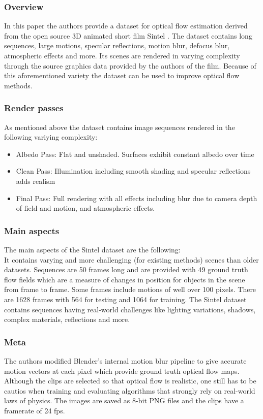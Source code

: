 \documentclass[a4paper,cleardoubleempty,BCOR1cm]{scrbook}
\begin{document}
\subsubsection{Overview}
In this paper the authors provide a dataset for optical flow estimation derived from the open source 3D animated short film Sintel
.
The dataset contains long sequences, large motions, specular reflections, motion blur, defocus blur, atmospheric effects and more. Its scenes are rendered in varying complexity through the source graphics data provided by the authors of the film. Because of this aforementioned variety the dataset can be used to improve optical flow methods. 

\subsubsection{Render passes}
As mentioned above the dataset contains image sequences rendered in the following variying complexity:\\
\begin{itemize}
	\item Albedo Pass: Flat and unshaded. Surfaces exhibit constant albedo over time
	\item Clean Pass: Illumination including smooth shading and specular reflections adds realism
	\item Final Pass: Full rendering with all effects including blur due to camera depth of field and motion, and atmospheric effects.
\end{itemize}

\subsubsection{Main aspects}
The main aspects of the Sintel dataset are the following:\\
It contains varying and more challenging (for existing methods) scenes than older datasets. Sequences are 50 frames long and are provided with 49 ground truth flow fields which are a measure of changes in position for objects in the scene from frame to frame. Some frames include motions of well over 100 pixels. There are 1628 frames with 564 for testing and 1064 for training. The Sintel dataset contains sequences having real-world challenges like lighting variations, shadows, complex materials, reflections and more.

\subsubsection{Meta}
The authors modified Blender's internal motion blur pipeline to give accurate motion vectors at each pixel which provide ground truth optical flow maps. Although the clips are selected so that optical flow is realistic, one still has to be cautios when training and evaluating algorithms that strongly rely on real-world laws of physics. The images are saved as 8-bit PNG files and the clips have a framerate of 24 fps.
\end{document}
